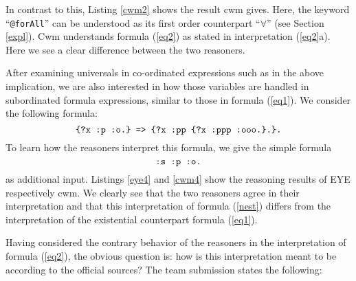 In contrast to this, Listing \ref{cwm2} shows the result cwm gives.  Here, the keyword\linebreak %
``\verb!@forAll!''
can be understood as its first order counterpart ``$\forall$'' (see Section \ref{expl}). %
Cwm understands 
formula (\ref{eq2}) as stated in interpretation (\ref{eq2}a). Here we see a clear difference between the two reasoners.




After examining universals in co-ordinated expressions such as in the above implication, 
we are also interested in how those variables are handled in subordinated formula expressions, similar to those in formula (\ref{eq1}). 
We consider the following formula: 
\begin{equation}\label{nest}
 \verb!{?x :p :o.} => {?x :pp {?x :ppp :ooo.}.}.!
\end{equation}
To learn how the reasoners interpret this formula, we give the simple formula \begin{equation}\label{spo}\verb!:s :p :o.! \end{equation} as additional input. 
Listings \ref{eye4} and \ref{cwm4} show the reasoning results of EYE respectively cwm. We clearly see that the two reasoners agree in their interpretation 
and that this interpretation of formula (\ref{nest}) differs from the interpretation of the existential counterpart formula (\ref{eq1}). 





Having considered the contrary behavior of the reasoners in the interpretation of formula (\ref{eq2}), the obvious question is: 
how is this interpretation meant to be according to the official sources? The team submission \cite{Notation3} states the following:
%









